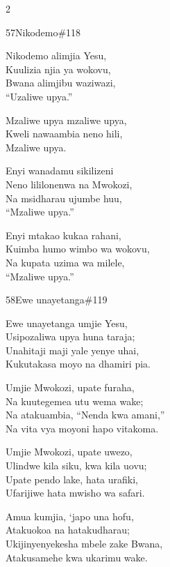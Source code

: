 \begin{multicols}{2}
\begin{hymn}{57}{Nikodemo}{\#118}
\begin{stanza}
Nikodemo alimjia Yesu,\\
Kuulizia njia ya wokovu,\\
Bwana alimjibu waziwazi,\\
``Uzaliwe upya.''
\end{stanza}
\begin{chorus}
Mzaliwe upya mzaliwe upya,\\
Kweli nawaambia neno hili,\\
Mzaliwe upya.
\end{chorus}
\begin{stanza}
Enyi wanadamu sikilizeni\\
Neno lililonenwa na Mwokozi,\\
Na msidharau ujumbe huu,\\
``Mzaliwe upya.''
\end{stanza}
\begin{stanza}
Enyi mtakao kukaa rahani,\\
Kuimba humo wimbo wa wokovu,\\
Na kupata uzima wa milele,\\
``Mzaliwe upya.''
\end{stanza}
\end{hymn}

\begin{hymn}{58}{Ewe unayetanga}{\#119}
\begin{stanza}
Ewe unayetanga umjie Yesu,\\
Usipozaliwa upya huna taraja;\\
Unahitaji maji yale yenye uhai,\\
Kukutakasa moyo na dhamiri pia.
\end{stanza}
\begin{stanza}
Umjie Mwokozi, upate furaha,\\
Na kuutegemea utu wema wake;\\
Na atakuambia, ``Nenda kwa amani,''\\
Na vita vya moyoni hapo vitakoma.
\end{stanza}
\begin{stanza}
Umjie Mwokozi, upate uwezo,\\
Ulindwe kila siku, kwa kila uovu;\\
Upate pendo lake, hata urafiki,\\
Ufarijiwe hata mwisho wa safari.
\end{stanza}
\begin{stanza}
Amua kumjia, `japo una hofu,\\
Atakuokoa na hatakudharau;\\
Ukijinyenyekesha mbele zake Bwana,\\
Atakusamehe kwa ukarimu wake.
\end{stanza}
\end{hymn}


\end{multicols}
